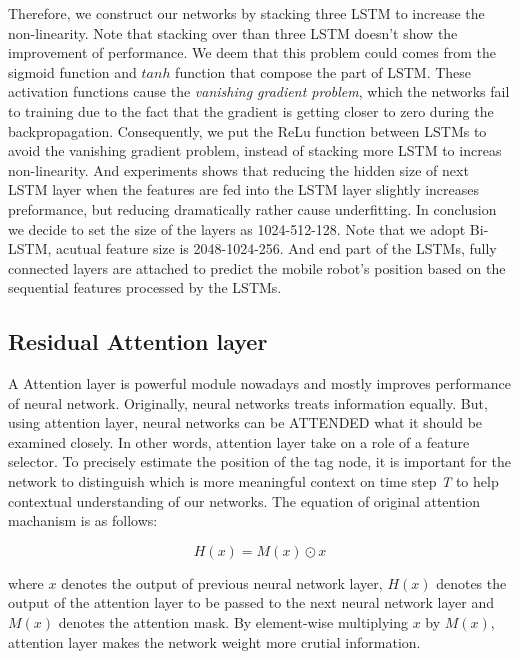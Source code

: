 \documentclass[letterpaper, 10 pt, conference]{ieeeconf}  %
\begin{document}
Therefore, we construct our networks by stacking three LSTM to increase the non-linearity. Note that stacking over than three LSTM doesn't show the improvement of performance. We deem that this problem could comes from the sigmoid function and $tanh$ function that compose the part of LSTM. These activation functions cause the \textit{vanishing gradient problem}\cite{pascanu2013difficulty}, which the networks fail to training due to the fact that the gradient is getting closer to zero during the backpropagation. Consequently, we put the ReLu function between LSTMs to avoid the vanishing gradient problem\cite{nair2010rectified}, instead of stacking more LSTM to increas non-linearity. And experiments shows that reducing the hidden size of next LSTM layer when the features are fed into the LSTM layer slightly increases preformance, but reducing dramatically rather cause underfitting. In conclusion we decide to set the size of the layers as 1024-512-128. Note that we adopt Bi-LSTM, acutual feature size is 2048-1024-256. And end part of the LSTMs, fully connected layers are attached to predict the mobile robot's position based on the sequential features processed by the LSTMs.  

\subsection{Residual Attention layer}

A Attention layer is powerful module nowadays and mostly improves performance of neural network. Originally, neural networks treats information equally. But, using attention layer, neural networks can be ATTENDED what it should be examined closely. In other words, attention layer take on a role of a feature selector\cite{wang2017residual}. To precisely estimate the position of the tag node, it is important for the network to distinguish which is more meaningful context on time step \textit{T} to help contextual understanding of our networks. The equation of original attention machanism is as follows:  

\begin{equation}
H(x)=M(x)\odot x
\end{equation} 

where $x$ denotes the output of previous neural network layer, $H(x)$ denotes the output of the attention layer to be passed to the next neural network layer and $M(x)$ denotes the attention mask. By element-wise multiplying $x$ by $M(x)$, attention layer makes the network weight more crutial information. 
\end{document}
